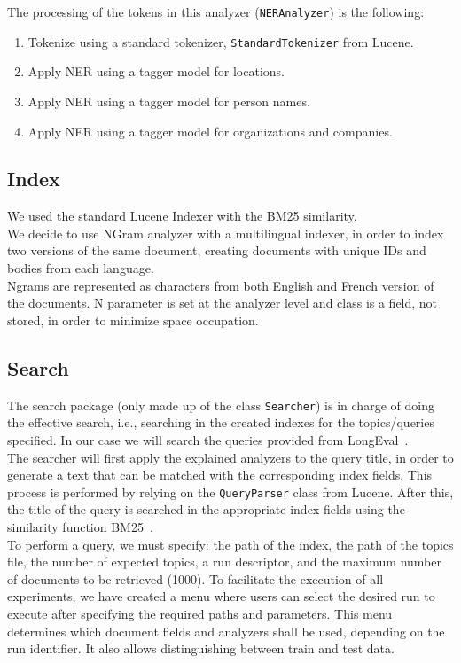 The processing of the tokens in this analyzer (\texttt{NERAnalyzer}) is the following:
\begin{enumerate}
    \item Tokenize using a standard tokenizer, \texttt{StandardTokenizer} from Lucene.
    \item Apply NER using a tagger model for locations.
    \item Apply NER using a tagger model for person names.
    \item Apply NER using a tagger model for organizations and companies.
\end{enumerate}

\subsection{Index}\label{subsec:index}
We used the standard Lucene Indexer with the BM25\cite{BM25} similarity.\\
We decide to use NGram analyzer with a multilingual indexer,
in order to index two versions of the same document, creating documents with
unique IDs and bodies from each language.\\
Ngrams are represented as characters from both English and French version of
the documents. N parameter is set at the analyzer level and class is a field,
not stored, in order to minimize space occupation.\\

\subsection{Search}\label{subsec:search}
The search package (only made up of the class \texttt{Searcher}) is in charge of doing the effective search, i.e.,
searching in the created indexes for the topics/queries specified.
In our case we will search the queries provided from LongEval~\cite{traindata}.\\

The searcher will first apply the explained analyzers to the query title, in order to generate a text that can be
matched with the corresponding index fields.
This process is performed by relying on the \texttt{QueryParser} class from Lucene.
After this, the title of the query is searched in the appropriate index fields using the similarity function
BM25~\cite{BM25}.\\

To perform a query, we must specify: the path of the index, the path of the topics file, the number of expected topics,
a run descriptor, and the maximum number of documents to be retrieved (1000).
To facilitate the execution of all experiments, we have created a menu where users can select the desired run to execute
after specifying the required paths and parameters.
This menu determines which document fields and analyzers shall be used, depending on the run identifier.
It also allows distinguishing between train and test data.\\

